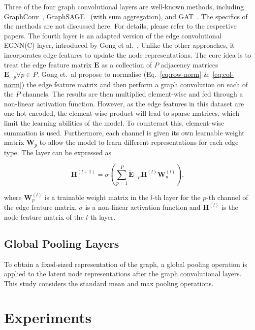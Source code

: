\documentclass[10pt,conference,compsocconf]{IEEEtran}
\begin{document}
Three of the four graph convolutional layers are well-known methods, including
GraphConv~\cite{graphconv}, GraphSAGE~\cite{graphsage} (with sum aggregation),
and GAT~\cite{gat}. The specifics of the methods are not discussed here. For
details, please refer to the respective papers. The fourth layer is an adapted
version of the edge convolutional EGNN(C) layer, introduced by Gong et
al.~\cite{egnn}. Unlike the other approaches, it incorporates edge features to
update the node representations. The core idea is to treat the edge feature
matrix $\mathbf{E}$ as a collection of $P$ adjacency matrices
$\mathbf{E}_{\cdot\cdot p} \forall p \in P$. Gong et.~al propose to normalise
(Eq.~\ref{eq:row-norm} \&~\ref{eq:col-norm}) the edge feature matrix and then
perform a graph convolution on each of the $P$ channels. The results are then
multiplied element-wise and fed through a non-linear activation function.
However, as the edge features in this dataset are one-hot encoded, the
element-wise product will lead to sparse matrices, which limit the learning
abilities of the model. To counteract this, element-wise summation is used.
Furthermore, each channel is given its own learnable weight matrix
$\mathbf{W}_p$ to allow the model to learn different representations for each
edge type. The layer can be expressed as

\begin{equation}
  \mathbf{H}^{(l+1)} = 
  \sigma\left(
    \sum_{p=1}^P \tilde{\mathbf{E}}_{\cdot\cdot p} \mathbf{H}^{(l)}
    \mathbf{W}^{(l)}_p 
    \right),
\end{equation}

where $\mathbf{W}^{(l)}_p$ is a trainable weight matrix in the $l$-th layer for
the $p$-th channel of the edge feature matrix, $\sigma$ is a non-linear
activation function and $\mathbf{H}^{(l)}$ is the node feature matrix of the
$l$-th layer.


\subsection{Global Pooling Layers}

To obtain a fixed-sized representation of the graph, a global pooling operation
is applied to the latent node representations after the graph convolutional
layers. This study considers the standard mean and max pooling operations.

\section{Experiments}
\end{document}
